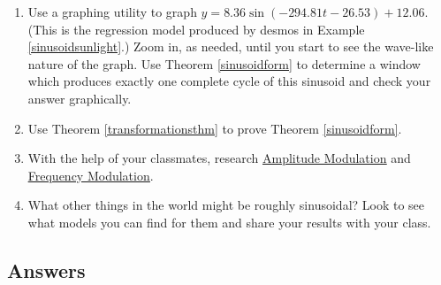 \begin{enumerate}
\normalsize

\medskip

\begin{enumerate}

\item \label{MoonIllumination} Using the techniques discussed in Example \ref{sinusoidsunlight}, fit a sinusoid to these data.\footnote{You may want to plot the data before you find the phase shift.} 

\item  Graph your model along with the data set to judge the reasonableness of the fit.

\item Use the model from \ref{MoonIllumination} to predict the fraction of the moon illuminated on June 1, 2009. \footnote{The listed fraction is $0.62$.}

\item Compare your results to those obtained using a graphing utility.

\end{enumerate}


\item \label{graphdesmosregression}  Use a graphing utility to graph $y = 8.36 \sin(-294.81t  - 26.53) + 12.06$.  (This is the regression model produced by desmos in Example \ref{sinusoidsunlight}.) Zoom in, as needed, until you start to see the wave-like nature of the graph.  Use Theorem \ref{sinusoidform} to determine a window which produces exactly one complete cycle of this sinusoid and check your answer graphically.

\item   \label{proofsinusoidformexercise} Use Theorem \ref{transformationsthm} to prove Theorem \ref{sinusoidform}.


\item  With the help of your classmates, research \href{http://en.wikipedia.org/wiki/Amplitude_modulation}{\underline{Amplitude Modulation}} and \href{http://en.wikipedia.org/wiki/Frequency_modulation}{\underline{Frequency Modulation}}.

\item What other things in the world might be roughly sinusoidal?  Look to see what models you can find for them and share your results with your class.

\end{enumerate}

\newpage


\subsection{Answers}

